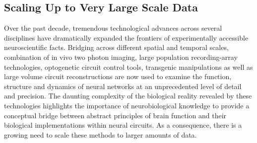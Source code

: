 \documentclass[brainsci, %
               review,accept,pdftex,moreauthors
               ]{Definitions/mdpi}
\begin{document}


%
\subsection{Scaling Up to Very Large Scale Data}
Over the past decade, tremendous technological advances across several disciplines have dramatically expanded the frontiers of experimentally accessible neuroscientific facts. Bridging across different spatial and temporal scales, combination of {in vivo} two photon imaging, large population recording-array technologies, optogenetic circuit control tools, transgenic manipulations as well as large volume circuit reconstructions are now used to examine the function, structure and dynamics of neural networks at an unprecedented level of detail and precision. The daunting complexity of the biological reality revealed by these technologies highlights the importance of neurobiological knowledge to provide a conceptual bridge between abstract principles of brain function and their biological implementations within neural circuits. As a consequence, there is a growing need to scale these methods to larger amounts of data. 
\end{document}
